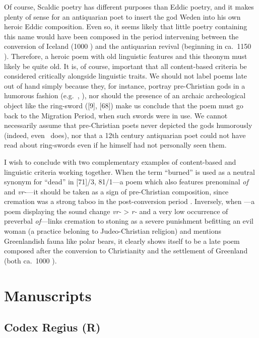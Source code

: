 Of course, Scaldic poetry has different purposes than Eddic poetry, and it makes plenty of sense for an antiquarian poet to insert the god Weden into his own heroic Eddic composition.  Even so, it seems likely that little poetry containing this name would have been composed in the period intervening between the conversion of Iceland (1000 \ce) and the antiquarian revival (beginning in ca.~1150 \ce).  Therefore, a heroic poem with old linguistic features and this theonym must likely be quite old.
It is, of course, important that all content-based criteria be considered critically alongside linguistic traits.  We should not label poems late out of hand simply because they, for instance, portray pre-Christian gods in a humorous fashion (e.g.~, ), nor should the presence of an archaic archeological object like the ring-sword ([9], [68]) make us conclude that the poem must go back to the Migration Period, when such swords were in use.  We cannot necessarily assume that pre-Christian poets never depicted the gods humorously (indeed, even \Iliad\ does), nor that a 12th century antiquarian poet could not have read about ring-swords even if he himself had not personally seen them.

I wish to conclude with two complementary examples of content-based and linguistic criteria working together.  When the term “burned” is used as a neutral synonym for “dead” in [71]/3, 81/1---a poem which also features prenominal \emph{of} and \emph{vr-}---it should be taken as a sign of pre-Christian composition, since cremation was a strong taboo in the post-conversion period \parencite[93--96]{Males2024Hav}.  Inversely, when ---a poem displaying the sound change \emph{vr-} > \emph{r-} and a very low occurrence of preverbal \emph{of}---links cremation to stoning as a severe punishment befitting an evil woman (a practice beloning to Judeo-Christian religion) and mentions Greenlandish fauna like polar bears, it clearly shows itself to be a late poem composed after the conversion to Christianity and the settlement of Greenland (both ca.~1000 \ce).

\section{Manuscripts}

\subsection{Codex Regius (R)}


